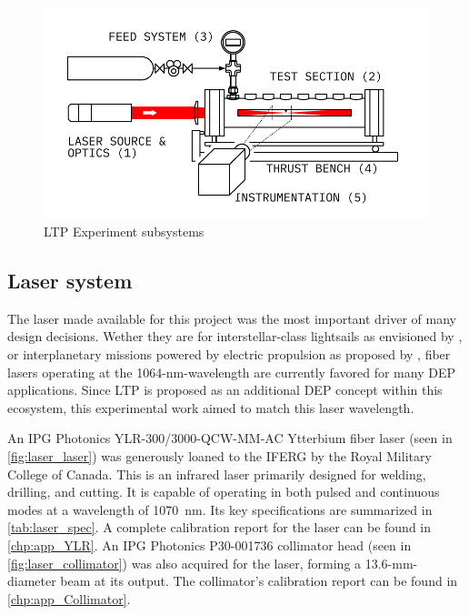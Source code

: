         \begin{figure}[h]
            \centering
            \includegraphics[]{assets/3 design/experiment_diagram.pdf}
            \caption{LTP Experiment subsystems}
            \label{fig:exp_subsys}
        \end{figure}

        \subsection{Laser system}
            The laser made available for this project was the most important driver of many design decisions. Wether they are for interstellar-class lightsails as envisioned by \textcite{lubinRoadmapInterstellarFlight2022}, or interplanetary missions powered by electric propulsion as proposed by \textcite{sheerinFastSolarSystem2021}, fiber lasers operating at the 1064-nm-wavelength are currently favored for many DEP applications. Since LTP is proposed as an additional DEP concept within this ecosystem, this experimental work aimed to match this laser wavelength.

            An IPG Photonics YLR-300/3000-QCW-MM-AC Ytterbium fiber laser (seen in \autoref{fig:laser_laser}) was generously loaned to the IFERG by the Royal Military College of Canada. This is an infrared laser primarily designed for welding, drilling, and cutting. It is capable of operating in both pulsed and continuous modes at a wavelength of \qty{1070}{nm}. Its key specifications are summarized in \autoref{tab:laser_spec}. A complete calibration report for the laser can be found in \autoref{chp:app_YLR}. An IPG Photonics P30-001736 collimator head (seen in \autoref{fig:laser_collimator}) was also acquired for the laser, forming a 13.6-mm-diameter beam at its output. The collimator's calibration report can be found in \autoref{chp:app_Collimator}.

